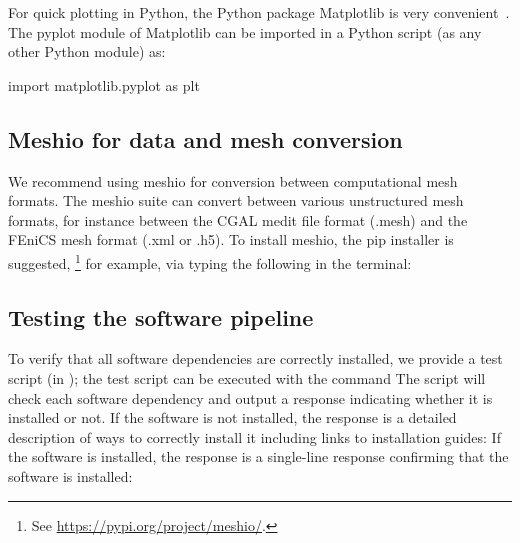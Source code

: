 

For quick plotting in Python, the Python package Matplotlib
is very convenient~\cite{hunter2007matplotlib}. The pyplot module of
Matplotlib can be imported in a Python script (as any other Python
module) as:
\begin{python}
import matplotlib.pyplot as plt
\end{python}

\subsection{Meshio for data and mesh conversion}
\label{sec:chp2:meshio}

We recommend using meshio \cite{schlomer2020nschloe} for conversion
between computational mesh formats. The meshio suite can convert
between various unstructured mesh formats, for instance between the
CGAL medit file format (.mesh) and the FEniCS mesh format (.xml or
.h5). To install meshio, the pip installer is
suggested, \footnote{See \url{https://pypi.org/project/meshio/}.} for example, via typing the following in the terminal:

\subsection{Testing the software pipeline}
\label{sec:chp2:tools:testing}

To verify that all software dependencies are correctly installed, we
provide a test script (in ); the test script can 
be executed with the command
The script will check each software dependency and output a response indicating 
whether it is installed or not. 
If the software is not installed, the response is a detailed description of ways to correctly install it including links to installation guides: 
If the software is installed, the response is a single-line response confirming that the software is installed:


